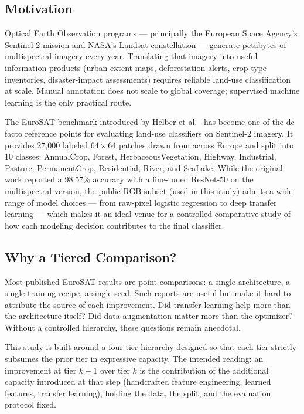 \documentclass[10pt,letterpaper]{article}
\begin{document}
\subsection{Motivation}
Optical Earth Observation programs --- principally the European Space Agency's Sentinel-2 mission and NASA's Landsat constellation --- generate petabytes of multispectral imagery every year. Translating that imagery into useful information products (urban-extent maps, deforestation alerts, crop-type inventories, disaster-impact assessments) requires reliable land-use classification at scale. Manual annotation does not scale to global coverage; supervised machine learning is the only practical route.

The EuroSAT benchmark introduced by Helber et al.~\cite{helber2019} has become one of the de facto reference points for evaluating land-use classifiers on Sentinel-2 imagery. It provides 27{,}000 labeled $64\times64$ patches drawn from across Europe and split into 10 classes: AnnualCrop, Forest, HerbaceousVegetation, Highway, Industrial, Pasture, PermanentCrop, Residential, River, and SeaLake. While the original work reported a 98.57\% accuracy with a fine-tuned ResNet-50 on the multispectral version, the public RGB subset (used in this study) admits a wide range of model choices --- from raw-pixel logistic regression to deep transfer learning --- which makes it an ideal venue for a controlled comparative study of how each modeling decision contributes to the final classifier.

\subsection{Why a Tiered Comparison?}
Most published EuroSAT results are point comparisons: a single architecture, a single training recipe, a single seed. Such reports are useful but make it hard to attribute the source of each improvement. Did transfer learning help more than the architecture itself? Did data augmentation matter more than the optimizer? Without a controlled hierarchy, these questions remain anecdotal.

This study is built around a four-tier hierarchy designed so that each tier strictly subsumes the prior tier in expressive capacity. The intended reading: an improvement at tier $k+1$ over tier $k$ is the contribution of the additional capacity introduced at that step (handcrafted feature engineering, learned features, transfer learning), holding the data, the split, and the evaluation protocol fixed.
\end{document}
